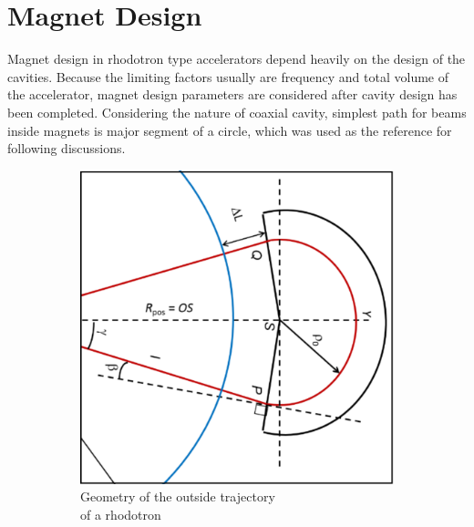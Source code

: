\documentclass[a4paper,oneside,12pt]{report}
\numberwithin{equation}{chapter}
\begin{document}
\newpage



\section{Magnet Design} \label{sec:magnet_design}
Magnet design in rhodotron type accelerators depend heavily on the design of the cavities.
Because the limiting factors usually are frequency and total volume of the accelerator, magnet design parameters are considered after cavity design has been completed.
Considering the nature of coaxial cavity, simplest path for beams inside magnets is major segment of a circle, which was used as the reference for following discussions.
\begin{figure}[H]
    \captionsetup[subfigure]{justification=centering}
    \captionsetup{justification=centering}
    \centering
    \begin{subfigure}{.5\textwidth}
      \centering
      \includegraphics[width=.9\linewidth]{./figures/design/Ltot.png}
      \caption{Geometry of the outside trajectory \\ of a rhodotron \cite{cite:rhodo_design}}
    \end{subfigure}%
    \centering
    \begin{subfigure}{.5\textwidth}
      \centering

\end{subfigure}
\end{figure}
\end{document}
